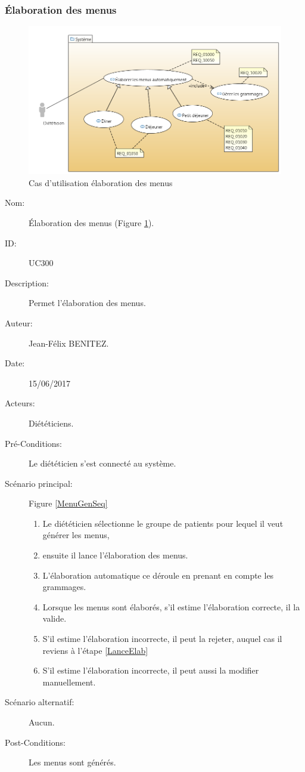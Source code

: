 \subsubsection{Élaboration des menus}
\begin{figure}
  \centering
      \includegraphics[width=1.00\textwidth]{../../CasDUtilisations/MenuGen/CasDUtilisation/MenuGen.png} %
\caption{Cas d'utilisation élaboration des menus}
\label{MenuGenCU}
\end{figure}

\begin{description}
\item[Nom:] Élaboration des menus (Figure \ref{MenuGenCU}).
\item[ID:] UC300
\item[Description:] Permet l'élaboration des menus.
\item[Auteur:] Jean-Félix BENITEZ.
\item[Date:] 15/06/2017
\item[Acteurs:] Diététiciens.
\item[Pré-Conditions:] Le diététicien s'est connecté au système.
\item[Scénario principal:] Figure \ref{MenuGenSeq}
  \begin{enumerate}
  \item Le diététicien sélectionne le groupe de patients pour lequel il veut générer les menus,
  \item \label{LanceElab}ensuite il lance l'élaboration des menus.
  \item L'élaboration automatique ce déroule en prenant en compte les grammages.
  \item Lorsque les menus sont élaborés, s'il estime l'élaboration correcte, il la valide.
  \item S'il estime l'élaboration incorrecte, il peut la rejeter, auquel cas il reviens à l'étape \ref{LanceElab}
  \item S'il estime l'élaboration incorrecte, il peut aussi la modifier manuellement.
  \end{enumerate}
\item[Scénario alternatif:] Aucun.
\item[Post-Conditions:] Les menus sont générés.
\end{description}

